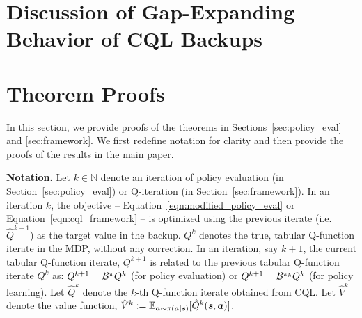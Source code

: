 
\section{Discussion of Gap-Expanding Behavior of CQL Backups}
\label{app:gap_amplify}
\vspace{-0.25cm}


\section{Theorem Proofs}
\label{app:missing_proofs}
\vspace{-0.3cm}

In this section, we provide proofs of the theorems in Sections~\ref{sec:policy_eval} and \ref{sec:framework}. We first redefine notation for clarity and then provide the proofs of the results in the main paper.

\textbf{Notation.} Let $k \in \mathbb{N}$ denote an iteration of policy evaluation (in Section~\ref{sec:policy_eval}) or Q-iteration (in Section~\ref{sec:framework}). In an iteration $k$, the objective -- Equation~\ref{eqn:modified_policy_eval} or Equation~\ref{eqn:cql_framework} -- is optimized using the previous iterate (i.e. $\hat{Q}^{k-1}$) as the target value in the backup. $Q^k$ denotes the true, tabular Q-function iterate in the MDP, without any correction. In an iteration, say $k+1$, the current tabular Q-function iterate, $Q^{k+1}$ is related to the previous tabular Q-function iterate ${Q}^k$ as: $Q^{k+1} = \mathcal{B}^{\pi} Q^k$ (for policy evaluation) or $Q^{k+1} = \mathcal{B}^{\pi_k} Q^k$ (for policy learning). Let $\hat{Q}^k$ denote the $k$-th Q-function iterate obtained from CQL. Let $\hat{V}^k$ denote the value function, $\hat{V}^k := \mathbb{E}_{\boldsymbol{a} \sim \pi(\boldsymbol{a}|\boldsymbol{s})}[\hat{Q}^k(\boldsymbol{s}, \boldsymbol{a})]$.   

